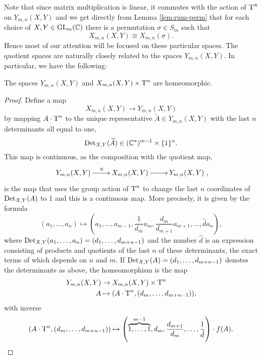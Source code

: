 Note that since matrix multiplication is linear, it commutes with the
action of $\operatorname{T}^n$ on $Y_{m,n}(X,Y)$ and we get directly from Lemma
\ref{lem:rum-perm} that for each choice of $X,Y\in \operatorname{GL}_m(\mathbb{C})$ there is
a permutation $\sigma \in S_m$ such that
\[ X_{m,n}(X,Y) \cong X_{m,n}(\sigma). \]
Hence most of our attention will be focused on these particular
spaces. The quotient spaces are naturally closely related to the
spaces $Y_{m,n}(X,Y)$. In particular, we have the following:

\begin{lemma}
  \label{lem:reduktion}
  The spaces $Y_{m,n}(X,Y)$ and $X_{m,n}(X,Y) \times \operatorname{T}^n$ are homeomorphic.
\end{lemma}
\begin{proof}
  Define a map
  \[ X_{m,n}(X,Y) \to Y_{m,n}(X,Y) \]
  by mapping $A\cdot \operatorname{T}^n$ to the unique representative
  $\widetilde{A} \in Y_{m,n}(X,Y)$ with the last
  $n$ determinants all equal to one,
  \[ \operatorname{Det}_{X,Y}(\widetilde{A}) \in (\mathbb{C}^*)^{m-1} \times
  \{1\}^n. \]
  This map is continuous, as the composition with the quotient map,
  \[ \xymatrix{Y_{m,n}(X,Y) \ar[r]^q & X_{m,n}(X,Y) \ar[r] &
    Y_{m,n}(X,Y)}, \]
  is the map that uses the group action of $\operatorname{T}^n$ to change the last
  $n$ coordinates of $\operatorname{Det}_{X,Y}(A)$ to 1 and this is a continuous
  map. More precisely, it is given by the formula
  \[ (a_1,\dots,a_n) \mapsto \left(a_1,\dots,a_{m-1},\frac{1}{d_m}a_m,
    \frac{d_m}{d_{m+1}} a_{m+1},\dots,\hat{d}a_n\right), \]
  where $\operatorname{Det}_{X,Y}(a_1,\dots,a_n) = (d_1,\dots,d_{m+n-1})$ and the
  number $\hat{d}$ is an expression consisting of products and
  quotients of the last $n$ of these
  determinants, the exact terms of which depends on $n$ and $m$. If
  $\operatorname{Det}_{X,Y}(A) = (d_1,\dots,d_{m+n-1})$ denotes the determinants as
  above, the homeomorphism is the map
  \begin{align*}
    Y_{m,n}(X,Y) &\to X_{m,n}(X,Y) \times \operatorname{T}^n\\
    A &\mapsto (A\cdot \operatorname{T}^n, (d_m,\dots,d_{m+n-1})),
  \end{align*}
  with inverse
  \[ (A\cdot \operatorname{T}^n, (d_m,\dots, d_{m+n-1})) \mapsto
  \left(\overbrace{1,\dots,1}^{m-1},d_m,\frac{d_{m+1}}{d_m},\dots,
    \frac{1}{\hat{d}}\right) \cdot f(A). \]
\end{proof}

